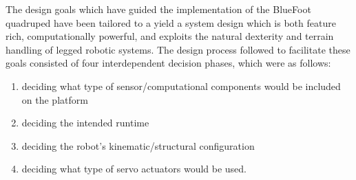 	The design goals which have guided the implementation of the BlueFoot quadruped have been tailored to a yield a system design which is both feature rich, computationally powerful, and exploits the natural dexterity and terrain handling of legged robotic systems. 
	The design process followed to facilitate these goals consisted of four interdependent decision phases, which were as follows:
		\begin{enumerate}
			\item{deciding what type of sensor/computational components would be included on the platform} 
			\item{deciding the intended runtime}
			\item{deciding the robot's kinematic/structural configuration}
			\item{deciding what type of servo actuators would be used.} 
		\end{enumerate}

